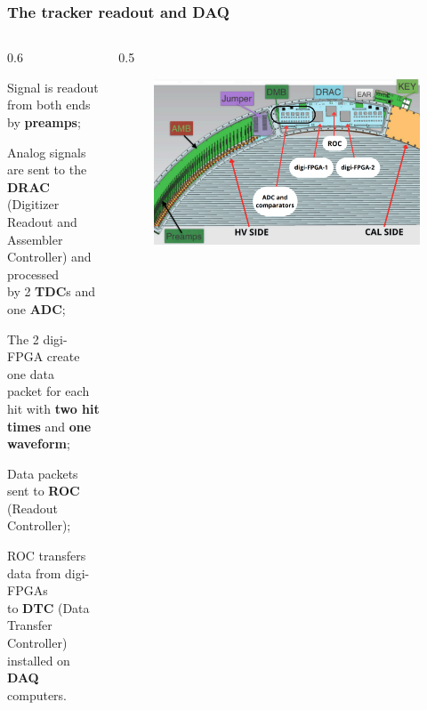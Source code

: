 \documentclass{beamer}
\begin{document}
\begin{frame}
    \frametitle{The tracker readout and DAQ}
    \vspace{-6mm}
    \begin{columns}
         \begin{column}{0.6\framewidth}
         \setlength{\leftmargini}{1em}
         \begin{itemize}
         {\footnotesize
         \item Signal is readout from both ends by  \textbf{preamps};
         \vspace{5mm}
         \item Analog signals are sent to the \\ \textbf{DRAC} (Digitizer Readout and \\
         Assembler Controller) and processed \\ by 2 \textbf{TDC}s and one \textbf{ADC};
         \vspace{5mm}
        \item The 2 digi-FPGA create one data \\ packet for each hit with \textbf{two hit} \\ \textbf{times} and \textbf{one waveform};
        \vspace{5mm}
        \item Data packets sent to \textbf{ROC} (Readout Controller);
        \vspace{5mm}
        \item ROC transfers data from digi-FPGAs \\ to \textbf{DTC} (Data Transfer Controller) \\ installed on \textbf{DAQ} computers.}
         \end{itemize}
    \end{column}
    \begin{column}{0.5\framewidth}
           \begin{figure}[h]
          \centering
                    \hspace*{-1.2em}
            \includegraphics[width=1.1\columnwidth]{figures/png/Screenshot_20240919_110354.png}

\end{figure}
\end{column}
\end{columns}
\end{frame}
\end{document}
